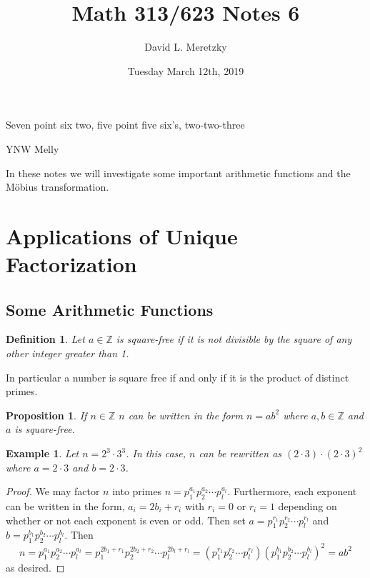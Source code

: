 \documentclass{article}
\title{ \vspace{-10ex} %
Math 313/623 Notes 6
}
\author{David L. Meretzky
}
\date{%
Tuesday March 12th, 2019
}
\theoremstyle{problemstyle}
\newtheorem{example}{Example}
\newtheorem{proposition}{Proposition}
\newtheorem{definition}{Definition}
\begin{document}
\maketitle

\epigraph{Seven point six two, five point five six's, two-two-three}{YNW Melly}

In these notes we will investigate some important arithmetic functions and the M\"obius transformation. 

\section*{Applications of Unique Factorization}

\subsection*{Some Arithmetic Functions}

\begin{definition}
Let $a \in \mathbb{Z}$ is square-free if it is not divisible by the square of any other integer greater than 1. 
\end{definition}

In particular a number is square free if and only if it is the product of distinct primes. 

\begin{proposition}
If $n \in \mathbb{Z}$ $n$ can be written in the form $n = ab^2$ where $a,b \in \mathbb{Z}$ and $a$ is square-free.  
\end{proposition}

\begin{example}
Let $n = 2^3\cdot3^3$. In this case, $n$ can be rewritten as $(2\cdot 3)\cdot(2\cdot 3)^2$ where $a = 2\cdot 3$ and $b = 2\cdot 3$.  
\end{example}

\begin{proof}
We may factor $n$ into primes $n = p_1^{a_1}p_2^{a_2}\cdots p_l^{a_l}$. Furthermore, each exponent can be written in the form, $a_i = 2b_i+r_i$ with $r_i = 0$ or $r_i = 1$ depending on whether or not each exponent is even or odd. Then set $a = p_1^{r_1}p_2^{r_2}\cdots p_l^{r_l}$ and $b = p_1^{b_1}p_2^{b_2}\cdots p_l^{b_l}$. Then $$n = p_1^{a_1}p_2^{a_2}\cdots p_l^{a_l} = p_1^{2b_1+r_1}p_2^{2b_2+r_2}\cdots p_l^{2b_l+r_l} = (p_1^{r_1}p_2^{r_2}\cdots p_l^{r_l})(p_1^{b_1}p_2^{b_2}\cdots p_l^{b_l})^2 = ab^2$$ as desired. 
\end{proof}
\end{document}
